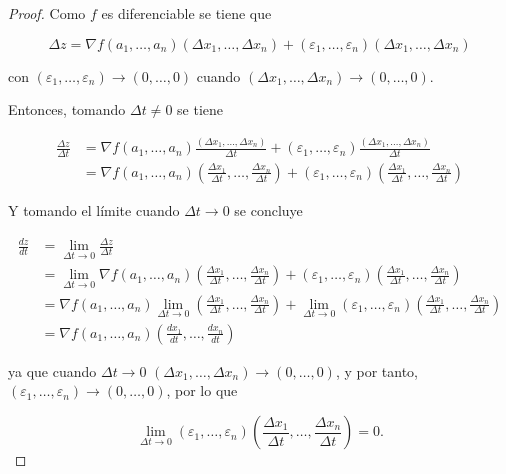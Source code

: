 \documentclass[
  a4paper,
]{scrreport}
\theoremstyle{plain}
\theoremstyle{plain}
\theoremstyle{definition}
\theoremstyle{definition}
\theoremstyle{plain}
\theoremstyle{definition}
\theoremstyle{remark}
\begin{document}
\begin{tcolorbox}[enhanced jigsaw, rightrule=.15mm, toptitle=1mm, colbacktitle=quarto-callout-note-color!10!white, bottomrule=.15mm, opacityback=0, arc=.35mm, breakable, toprule=.15mm, left=2mm, coltitle=black, colback=white, opacitybacktitle=0.6, titlerule=0mm, colframe=quarto-callout-note-color-frame, bottomtitle=1mm, title=\textcolor{quarto-callout-note-color}{\faInfo}\hspace{0.5em}{Demostración}, leftrule=.75mm]

\begin{proof}

Como \(f\) es diferenciable se tiene que

\[
\Delta z = \nabla f(a_1,\ldots,a_n) (\Delta x_1,\ldots, \Delta x_n) + (\varepsilon_1,\ldots, \varepsilon_n)(\Delta x_1,\ldots, \Delta x_n)
\]

con \((\varepsilon_1,\ldots,\varepsilon_n) \to (0,\ldots,0)\) cuando
\((\Delta x_1, \ldots, \Delta x_n) \to (0,\ldots,0)\).

Entonces, tomando \(\Delta t\neq 0\) se tiene

\begin{align*}
\frac{\Delta z}{\Delta t}
&= \nabla f(a_1,\ldots,a_n) \frac{(\Delta x_1,\ldots, \Delta x_n)}{\Delta t} + (\varepsilon_1,\ldots, \varepsilon_n) \frac{(\Delta x_1,\ldots, \Delta x_n)}{\Delta t} \\
&= \nabla f(a_1,\ldots,a_n) \left(\frac{\Delta x_1}{\Delta t},\ldots, \frac{\Delta x_n}{\Delta t}\right) + (\varepsilon_1,\ldots, \varepsilon_n) \left(\frac{\Delta x_1}{\Delta t},\ldots, \frac{\Delta x_n}{\Delta t}\right)
\end{align*}

Y tomando el límite cuando \(\Delta t \to 0\) se concluye

\begin{align*}
\frac{dz}{dt} &=
\lim_{\Delta t\to 0}\frac{\Delta z}{\Delta t} \\
&= \lim_{\Delta t\to 0} \nabla f(a_1,\ldots,a_n) \left(\frac{\Delta x_1}{\Delta t},\ldots, \frac{\Delta x_n}{\Delta t}\right) + (\varepsilon_1,\ldots, \varepsilon_n) \left(\frac{\Delta x_1}{\Delta t},\ldots, \frac{\Delta x_n}{\Delta t}\right) \\
&= \nabla f(a_1,\ldots,a_n)  \lim_{\Delta t\to 0}\left(\frac{\Delta x_1}{\Delta t},\ldots, \frac{\Delta x_n}{\Delta t}\right) + \lim_{\Delta t \to 0}(\varepsilon_1,\ldots, \varepsilon_n) \left(\frac{\Delta x_1}{\Delta t},\ldots, \frac{\Delta x_n}{\Delta t}\right) \\
&= \nabla f(a_1,\ldots,a_n) \left(\frac{dx_1}{dt},\ldots, \frac{dx_n}{dt}\right)
\end{align*}

ya que cuando \(\Delta t \to 0\)
\((\Delta x_1, \ldots, \Delta x_n) \to (0,\ldots,0)\), y por tanto,
\((\varepsilon_1,\ldots,\varepsilon_n) \to (0,\ldots,0)\), por lo que

\[
\lim_{\Delta t\to  0} (\varepsilon_1,\ldots, \varepsilon_n) \left(\frac{\Delta x_1}{\Delta t},\ldots, \frac{\Delta x_n}{\Delta t}\right) = 0.
\]

\end{proof}

\end{tcolorbox}
\end{document}
